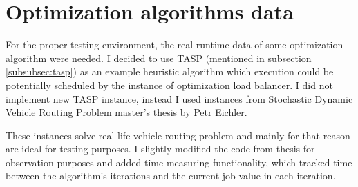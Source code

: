 \section{Optimization algorithms data}\label{sec:optimization-algorithms-data}
For the proper testing environment,
the real runtime data of some optimization algorithm were needed.
I decided to use TASP (mentioned in subsection \ref{subsubsec:tasp}) as an example heuristic algorithm
which execution could be potentially scheduled by the instance of optimization load balancer.
I did not implement new TASP instance,
instead I used instances from Stochastic Dynamic Vehicle Routing Problem master's thesis by Petr Eichler\cite{Eichler:Petr:2003}.

These instances solve real life vehicle routing problem 
and mainly for that reason are ideal for testing purposes.
I slightly modified the code from thesis for observation purposes
and added time measuring functionality,
which tracked time between the algorithm's iterations and the current job value in each iteration.
 


